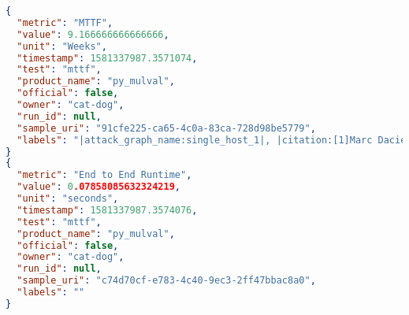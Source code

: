 


\begin{minipage}{\linewidth}
\begin{lstlisting}[basicstyle=\linespread{0.5}\listingsfont, language=json, label={lst:smaas_result}, caption={Sample S-MaaS Results},captionpos=b, linewidth=1\textwidth]
{
  "metric": "MTTF",
  "value": 9.166666666666666,
  "unit": "Weeks",
  "timestamp": 1581337987.3571074,
  "test": "mttf",
  "product_name": "py_mulval",
  "official": false,
  "owner": "cat-dog",
  "run_id": null,
  "sample_uri": "91cfe225-ca65-4c0a-83ca-728d98be5779",
  "labels": "|attack_graph_name:single_host_1|, |citation:[1]Marc Dacier, Yves Deswarte, and Mohamed Ka\u00e2niche. 1996. Quantitative assessment of operational security: Models and tools. Information Systems Security, ed. by SK Katsikas and D. Gritzalis, London, Chapman & Hall (1996), 179\u201386.\n|, |cite_key:Dacier1996|, |mttf:[1.4999999999999998, 1.75, 2.6666666666666665, 3.25]|, |run_number:0|, |tmatrix_headers:[\"13\", \"8\", \"5\", \"3\", \"1\"]|, |tmatrix_probs:[[0.3333333333333333, 0.3076923076923077, 0.358974358974359, 0.0, 0.0], [0.0, 0.42857142857142855, 0.5714285714285714, 0.0, 0.0], [0.0, 0.0, 0.625, 0.375, 0.0], [0.0, 0.0, 0.0, 0.6923076923076923, 0.3076923076923077], [0.0, 0.0, 0.0, 0.0, 1.0]]|"
}
{
  "metric": "End to End Runtime",
  "value": 0.07858085632324219,
  "unit": "seconds",
  "timestamp": 1581337987.3574076,
  "test": "mttf",
  "product_name": "py_mulval",
  "official": false,
  "owner": "cat-dog",
  "run_id": null,
  "sample_uri": "c74d70cf-e783-4c40-9ec3-2ff47bbac8a0",
  "labels": ""
}
\end{lstlisting}
\end{minipage}